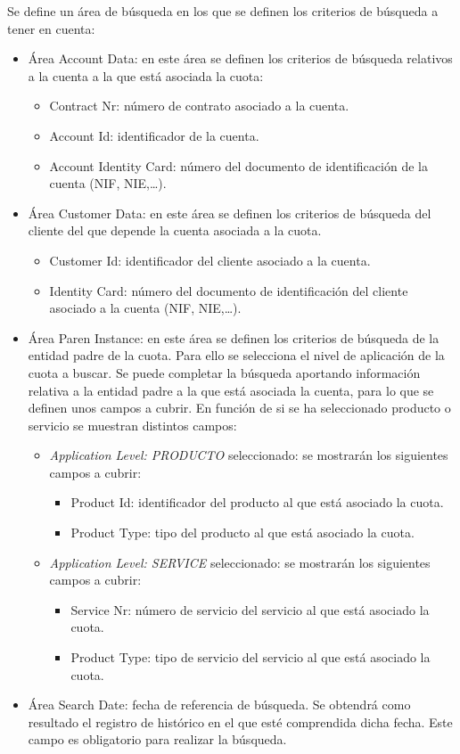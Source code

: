 Se define un área de búsqueda en los que se definen los criterios de búsqueda a tener en cuenta:
\begin{itemize}
	\item Área Account Data: en este área se definen los criterios de búsqueda relativos a la cuenta a la que está asociada la cuota:
		\begin{itemize}
			\item Contract Nr: número de contrato asociado a la cuenta.
			\item Account Id: identificador de la cuenta.
			\item Account Identity Card: número del documento de identificación de la cuenta (NIF, NIE,\dots).
		\end{itemize}
	\item Área Customer Data: en este área se definen los criterios de búsqueda del cliente del que depende la cuenta asociada a la cuota.
		\begin{itemize}
			\item Customer Id: identificador del cliente asociado a la cuenta.
			\item Identity Card: número del documento de identificación del cliente asociado a la cuenta (NIF, NIE,\dots).
		\end{itemize}
	\item Área Paren Instance: en este área se definen los criterios de búsqueda de la entidad padre de la cuota. Para ello se selecciona el nivel de aplicación de la cuota a buscar. Se puede completar la búsqueda aportando información relativa a la entidad padre a la que está asociada la cuenta, para lo que se definen unos campos a cubrir. En función de si se ha seleccionado producto o servicio se muestran distintos campos:
	\begin{itemize}
 		\item \emph{Application Level: PRODUCTO} seleccionado: se mostrarán los siguientes campos a cubrir:
			\begin{itemize}
				\item Product Id: identificador del producto al que está asociado la cuota.
				\item Product Type: tipo del producto al que está asociado la cuota.
			\end{itemize}
		\item \emph{Application Level: SERVICE} seleccionado:  se mostrarán los siguientes campos a cubrir:
		\begin{itemize}
			\item Service Nr: número de servicio del servicio al que está asociado la cuota.
			\item Product Type: tipo de servicio del servicio al que está asociado la cuota.
		\end{itemize}
		
	\end{itemize}	    	
	\item Área Search Date: fecha de referencia de búsqueda. Se obtendrá como resultado el registro de histórico en el que esté comprendida dicha fecha. Este campo es obligatorio para realizar la búsqueda.
\end{itemize}

